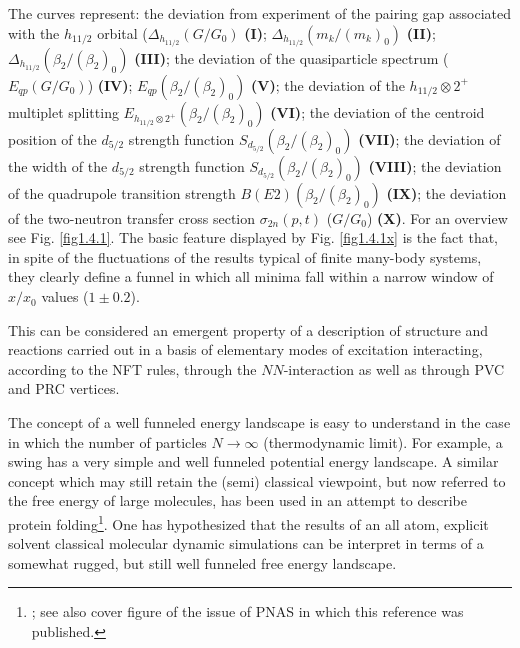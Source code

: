  
 The  curves represent: the deviation from experiment of the  pairing gap associated with the $h_{11/2}$ orbital 
 ($\Delta_{h_{11/2}} (G/G_0)$ \textbf{(I)};  
 $\Delta_{h_{11/2}} (m_k/(m_k)_0)$ \textbf{(II)};  $\Delta_{h_{11/2}} (\beta_{2}/(\beta_{2})_0)$ \textbf{(III)};
 the deviation of the quasiparticle spectrum ($E_{qp}(G/G_0)$) \textbf{(IV)};  $E_{qp}(\beta_{2}/(\beta_{2})_0)$ \textbf{(V)};
 the deviation of the $h_{11/2}\otimes 2^+$ multiplet splitting  $E_{h_{11/2}\otimes 2^+}(\beta_{2}/(\beta_{2})_0)$ \textbf{(VI)}; 
 the deviation of the  centroid position of the $d_{5/2}$ strength function $S_{d_{5/2}}(\beta_{2}/(\beta_{2})_0)$ \textbf{(VII)}; 
 the deviation of the width of the $d_{5/2}$ strength function  $S_{d_{5/2}} (\beta_{2}/(\beta_{2})_0)$ \textbf{(VIII)};
 the deviation  of the  quadrupole transition strength  $B(E2) (\beta_{2}/(\beta_{2})_0)$ \textbf{(IX)}; the deviation of the two-neutron transfer cross section $\sigma_{2n} (p,t)$ ($G/G_0$) \textbf{(X)}. For an overview see Fig. \ref{fig1.4.1}.
 The basic feature displayed by  Fig. \ref{fig1.4.1x} is the fact that, in spite of the fluctuations of the results typical of finite  many-body systems, they clearly define a funnel in which all minima fall within a narrow window of $x/x_0$ values ($1 \pm 0.2$). 
 
 This can be considered  an emergent property of a description of structure and reactions carried out in a basis of elementary modes of excitation interacting, according to the NFT rules, through the $NN$-interaction as well as through PVC and PRC vertices. 
 
 
 
 The concept of a well funneled energy landscape  is easy to understand in the case in which the number of particles $N\rightarrow \infty$ (thermodynamic limit). For example, a swing has a very simple and well funneled potential energy landscape. A similar concept which may still retain the (semi) classical viewpoint, but now referred to the free energy of large molecules, has been used in an attempt to describe protein folding\footnote{\cite{Wolynes:16,Wolynes:12}; see also cover figure of the issue of PNAS in which this reference was published.}. One has hypothesized that the results of an all atom, explicit solvent classical molecular dynamic simulations can be interpret in terms of a somewhat rugged, but still well funneled free energy landscape.

